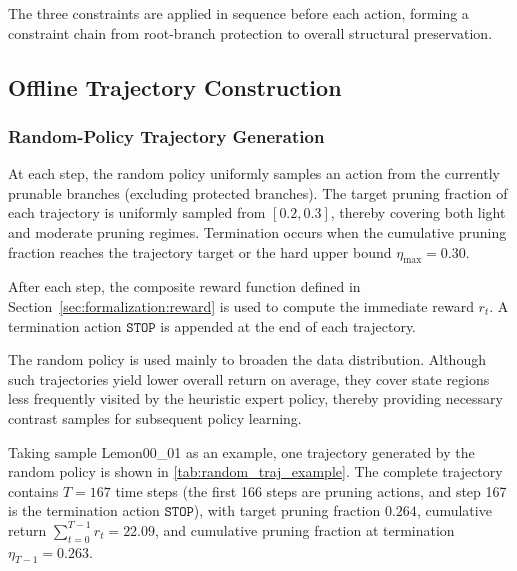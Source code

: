 \documentclass[12pt,a4paper,fontset=fandol]{ctexart}
\begin{document}
The three constraints are applied in sequence before each action,
forming a constraint chain from root-branch protection to overall structural preservation.


\subsection{Offline Trajectory Construction}\label{sec:model:dataset}

\subsubsection{Random-Policy Trajectory Generation}

At each step, the random policy uniformly samples an action from the currently prunable branches (excluding protected branches).
The target pruning fraction of each trajectory is uniformly sampled from $[0.2, 0.3]$,
thereby covering both light and moderate pruning regimes.
Termination occurs when the cumulative pruning fraction reaches the trajectory target or the hard upper bound $\eta_{\max}=0.30$.

After each step, the composite reward function defined in Section~\ref{sec:formalization:reward}
is used to compute the immediate reward $r_t$.
A termination action $\texttt{STOP}$ is appended at the end of each trajectory.

The random policy is used mainly to broaden the data distribution.
Although such trajectories yield lower overall return on average,
they cover state regions less frequently visited by the heuristic expert policy,
thereby providing necessary contrast samples for subsequent policy learning.

Taking sample Lemon00\_01 as an example, one trajectory generated by the random policy is shown in \cref{tab:random_traj_example}.
The complete trajectory contains $T = 167$ time steps (the first 166 steps are pruning actions, and step 167 is the termination action $\texttt{STOP}$),
with target pruning fraction $0.264$,
cumulative return $\sum_{t=0}^{T-1} r_t = 22.09$,
and cumulative pruning fraction at termination $\eta_{T-1} = 0.263$.
\end{document}
